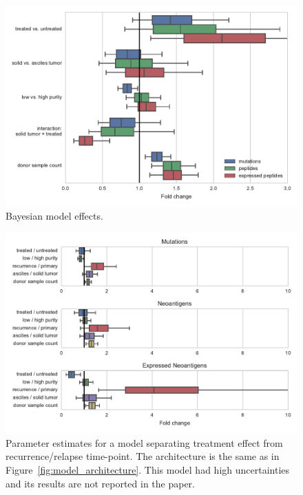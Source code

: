 \begin{figure}[htbp]
\centering
\includegraphics[scale=1.0]{figures/bayesian_model_effects.pdf}
\caption{Bayesian model effects. }
\label{fig:bayesian_model_effects}
\end{figure}

\begin{figure}[htbp]
\centering
\includegraphics[scale=1.0]{figures/bayesian_model_effects_separate.pdf}
\caption{Parameter estimates for a model separating treatment effect from recurrence/relapse time-point. The architecture is the same as in Figure~\ref{fig:model_architecture}. This model had high uncertainties and its results are not reported in the paper.}
\label{fig:bayesian_model_effects_separate}
\end{figure}


